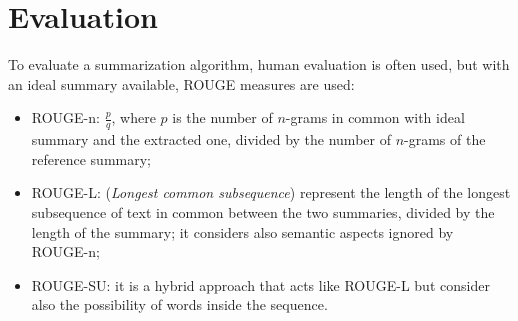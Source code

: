 \documentclass[11pt, a4page]{article}
\begin{document}
\section{Evaluation}
To evaluate a summarization algorithm, human evaluation is often used, but with an ideal summary available, ROUGE measures are used:
\begin{itemize}
\item ROUGE-n: $\frac{p}{q}$, where $p$ is the number of $n$-grams in common with ideal summary and the extracted one, divided by the number of $n$-grams of the reference summary;
\item ROUGE-L: (\textit{Longest common subsequence}) represent the length of the longest subsequence of text in common between the two summaries, divided by the length of the summary; it considers also semantic aspects ignored by ROUGE-n;
  \item ROUGE-SU: it is a hybrid approach that acts like ROUGE-L but consider also the possibility of words inside the sequence.
\end{itemize}
\end{document}

